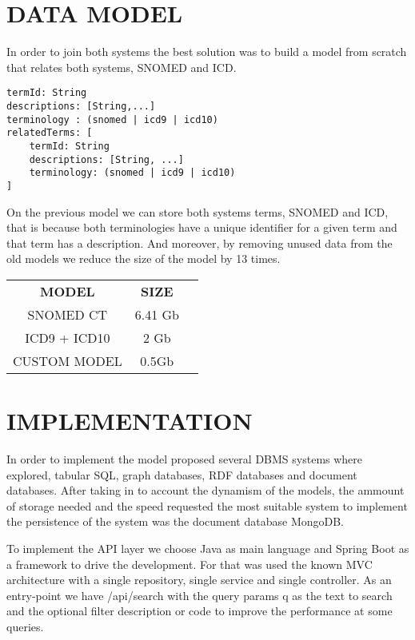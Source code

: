 \documentclass[letterpaper, 10 pt, conference]{ieeeconf}  %
\begin{document}
\section{DATA MODEL}
In order to join both systems the best solution was to build a model from scratch that relates both systems, SNOMED and ICD.
\begin{lstlisting}
termId: String
descriptions: [String,...]
terminology : (snomed | icd9 | icd10)
relatedTerms: [
    termId: String
    descriptions: [String, ...]
    terminology: (snomed | icd9 | icd10)
]
\end{lstlisting}

On the previous model we can store both systems terms, SNOMED and ICD, that is because both terminologies have a unique identifier for a given term and that term has a description. And moreover, by removing unused data from the old models we reduce the size of the model by 13 times. 
\begin{center}
\begin{tabular}{|c|c|c}
\cline{1-2}
\textbf{MODEL} & \textbf{SIZE}  \\ \cline{1-2}
SNOMED CT      & 6.41 Gb        \\ \cline{1-2}
ICD9 + ICD10   & 2 Gb           \\ \cline{1-2}
CUSTOM MODEL   & 0.5Gb          \\ \cline{1-2}
\end{tabular}
\end{center}

\section{IMPLEMENTATION}
In order to implement the model proposed several DBMS systems where explored, tabular SQL, graph databases, RDF databases and document databases. After taking in to account the dynamism of the models, the ammount of storage needed and the speed requested the most suitable system to implement the persistence of the system was the document database MongoDB.

To implement the API layer we choose Java as main language and Spring Boot as a framework to drive the development. For that was used the known MVC architecture with a single repository, single service and single controller. As an entry-point we have /api/search with the query params q as the text to search and the optional filter description or code to improve the performance at some queries.

\addtolength{\textheight}{-12cm}   %
\end{document}
